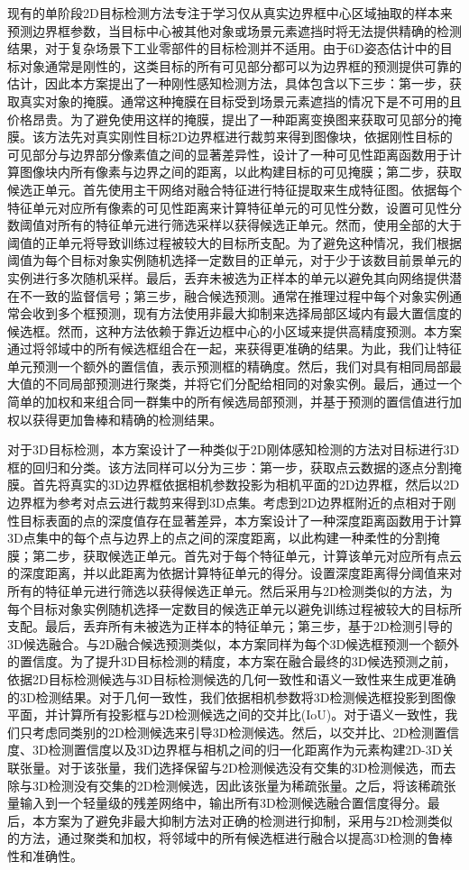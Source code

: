 \documentclass[12pt]{article}
\begin{document}
现有的单阶段2D目标检测方法专注于学习仅从真实边界框中心区域抽取的样本来预测边界框参数，当目标中心被其他对象或场景元素遮挡时将无法提供精确的检测结果，对于复杂场景下工业零部件的目标检测并不适用。由于6D姿态估计中的目标对象通常是刚性的，这类目标的所有可见部分都可以为边界框的预测提供可靠的估计，因此本方案提出了一种刚性感知检测方法，具体包含以下三步：第一步，获取真实对象的掩膜。通常这种掩膜在目标受到场景元素遮挡的情况下是不可用的且价格昂贵。为了避免使用这样的掩膜，提出了一种距离变换图来获取可见部分的掩膜。该方法先对真实刚性目标2D边界框进行裁剪来得到图像块，依据刚性目标的可见部分与边界部分像素值之间的显著差异性，设计了一种可见性距离函数用于计算图像块内所有像素与边界之间的距离，以此构建目标的可见掩膜；第二步，获取候选正单元。首先使用主干网络对融合特征进行特征提取来生成特征图。依据每个特征单元对应所有像素的可见性距离来计算特征单元的可见性分数，设置可见性分数阈值对所有的特征单元进行筛选采样以获得候选正单元。然而，使用全部的大于阈值的正单元将导致训练过程被较大的目标所支配。为了避免这种情况，我们根据阈值为每个目标对象实例随机选择一定数目的正单元，对于少于该数目前景单元的实例进行多次随机采样。最后，丢弃未被选为正样本的单元以避免其向网络提供潜在不一致的监督信号；第三步，融合候选预测。通常在推理过程中每个对象实例通常会收到多个框预测，现有方法使用非最大抑制来选择局部区域内有最大置信度的候选框。然而，这种方法依赖于靠近边框中心的小区域来提供高精度预测。本方案通过将邻域中的所有候选框组合在一起，来获得更准确的结果。为此，我们让特征单元预测一个额外的置信值，表示预测框的精确度。然后，我们对具有相同局部最大值的不同局部预测进行聚类，并将它们分配给相同的对象实例。最后，通过一个简单的加权和来组合同一群集中的所有候选局部预测，并基于预测的置信值进行加权以获得更加鲁棒和精确的检测结果。

对于3D目标检测，本方案设计了一种类似于2D刚体感知检测的方法对目标进行3D框的回归和分类。该方法同样可以分为三步：第一步，获取点云数据的逐点分割掩膜。首先将真实的3D边界框依据相机参数投影为相机平面的2D边界框，然后以2D边界框为参考对点云进行裁剪来得到3D点集。考虑到2D边界框附近的点相对于刚性目标表面的点的深度值存在显著差异，本方案设计了一种深度距离函数用于计算3D点集中的每个点与边界上的点之间的深度距离，以此构建一种柔性的分割掩膜；第二步，获取候选正单元。首先对于每个特征单元，计算该单元对应所有点云的深度距离，并以此距离为依据计算特征单元的得分。设置深度距离得分阈值来对所有的特征单元进行筛选以获得候选正单元。然后采用与2D检测类似的方法，为每个目标对象实例随机选择一定数目的候选正单元以避免训练过程被较大的目标所支配。最后，丢弃所有未被选为正样本的特征单元；第三步，基于2D检测引导的3D候选融合。与2D融合候选预测类似，本方案同样为每个3D候选框预测一个额外的置信度。为了提升3D目标检测的精度，本方案在融合最终的3D候选预测之前，依据2D目标检测候选与3D目标检测候选的几何一致性和语义一致性来生成更准确的3D检测结果。对于几何一致性，我们依据相机参数将3D检测候选框投影到图像平面，并计算所有投影框与2D检测候选之间的交并比(IoU)。对于语义一致性，我们只考虑同类别的2D检测候选来引导3D检测候选。然后，以交并比、2D检测置信度、3D检测置信度以及3D边界框与相机之间的归一化距离作为元素构建2D-3D关联张量。对于该张量，我们选择保留与2D检测候选没有交集的3D检测候选，而去除与3D检测没有交集的2D检测候选，因此该张量为稀疏张量。之后，将该稀疏张量输入到一个轻量级的残差网络中，输出所有3D检测候选融合置信度得分。最后，本方案为了避免非最大抑制方法对正确的检测进行抑制，采用与2D检测类似的方法，通过聚类和加权，将邻域中的所有候选框进行融合以提高3D检测的鲁棒性和准确性。
\end{document}
